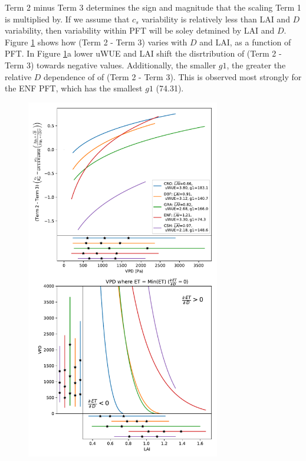 \documentclass[draft,linenumbers]{agujournal}
\begin{document}
Term 2 minus Term 3 determines the sign and magnitude that the scaling Term 1 is multiplied by. If we assume that $c_s$ variability is relatively less than LAI and $D$ variability, then variability within PFT will be soley detmined by LAI and $D$. Figure \ref{term3} shows how (Term 2 - Term 3) varies with $D$ and LAI, as a function of PFT. In Figure \ref{term3}a lower uWUE and LAI shift the disrtribution of (Term 2 - Term 3) towards negative values. Additionally, the smaller $g1$, the greater the relative $D$ dependence of of (Term 2 - Term 3). This is observed most strongly for the ENF PFT, which has the smallest $g1$ (74.31). 


 
\begin{figure}[h]
\centering
\includegraphics[width=20pc]{./fig05.pdf}
\caption{}
\label{term3}
\end{figure}
\end{document}
